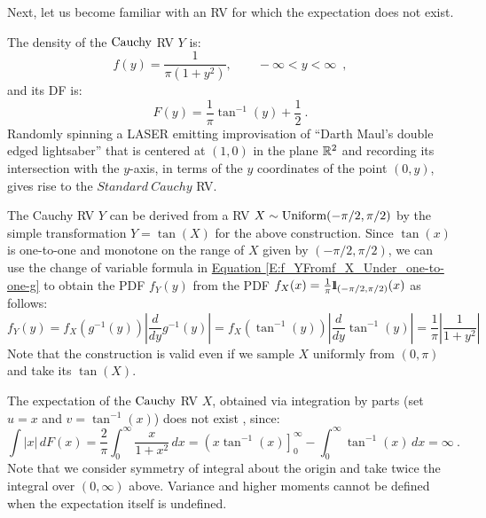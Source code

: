 Next, let us become familiar with an RV for which the expectation does not exist.  %
\begin{model}[$\cauchy$]\label{M:Cauchy}
The density of the $\cauchy$ RV $Y$ is:
\begin{equation}\label{E:StandardCauchypdf}
f(y) = \frac{1}{\pi (1+y^2)}, \qquad -\infty < y < \infty \enspace ,
\end{equation}
and its DF is:
\begin{equation}\label{E:StandardCauchycdf}
F(y) = \frac{1}{\pi} \tan^{-1} (y) + \frac{1}{2} \ .
\end{equation}
Randomly spinning a LASER emitting improvisation of ``Darth Maul's double edged lightsaber'' that is centered at $(1,0)$ in the plane $\mathbb{R}^2$ and recording its intersection with the $y$-axis, in terms of the $y$ coordinates of the point $(0,y)$, gives rise to the $Standard~Cauchy$ RV.

The Cauchy RV $Y$ can be derived from a RV $X \sim \mbox{{\rm Uniform}}(-\pi/2,\pi/2)$ by the simple transformation $Y = \tan(X)$ for the above construction. 
Since $\tan(x)$ is one-to-one and monotone on the range of $X$ given by $(-\pi/2,\pi/2)$, 
we can use the change of variable formula in \hyperref[E:f_YFromf_X_Under_one-to-one-g]{Equation \ref*{E:f_YFromf_X_Under_one-to-one-g}} to obtain the PDF $f_Y(y)$ from the PDF $f_X(x)=\frac{1}{\pi}{1}\mspace{-11 mu}{1}_{(-\pi/2,\pi/2)}(x)$ as follows:
\[
f_Y(y) = f_X(g^{-1}(y)) \left| \frac{d}{dy} g^{-1}(y) \right| = f_X(\tan^{-1}(y)) \left| \frac{d}{dy} \tan^{-1}(y) \right| = \frac{1}{\pi} \left| \frac{1}{1+y^2} \right|
\]
Note that the construction is valid even if we sample $X$ uniformly from $(0,\pi)$ and take its $\tan(X)$.
\end{model}

\begin{example}
The expectation of the $\cauchy$ RV $X$, obtained via integration by parts (set $u=x$ and $v=\tan^{-1}(x)$) does not exist  %
, since:
\begin{equation}\label{E:CauchyMeanDoesNotExist}
\int \left|x\right|\,dF(x) = \frac{2}{\pi} \int_0^{\infty} \frac{x}{1+x^2}\,dx = \left(x \tan^{-1}(x) \right]_0^{\infty} - \int_0^{\infty} \tan^{-1}(x)\, dx = \infty \ .
\end{equation}
Note that we consider symmetry of integral about the origin and take twice the integral over $(0,\infty)$ above. 
Variance and higher moments cannot be defined when the expectation itself is undefined.
\end{example}

